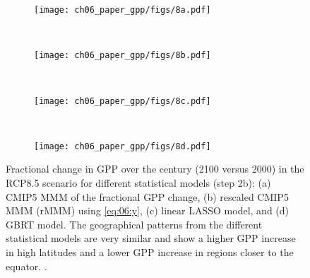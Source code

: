 \begin{figure}[t]
  \centering
  \begin{subfigure}[b]{\SubfigureWidth{}}
    \texttt{[image: ch06\_paper\_gpp/figs/8a.pdf]}
    \caption{}
    \label{fig:06:step2b_results:a}
  \end{subfigure}
  ~
  \begin{subfigure}[b]{\SubfigureWidth{}}
    \texttt{[image: ch06\_paper\_gpp/figs/8b.pdf]}
    \caption{}
    \label{fig:06:step2b_results:b}
  \end{subfigure}
  \\
  \begin{subfigure}[b]{\SubfigureWidth{}}
    \texttt{[image: ch06\_paper\_gpp/figs/8c.pdf]}
    \caption{}
    \label{fig:06:step2b_results:c}
  \end{subfigure}
  ~
  \begin{subfigure}[b]{\SubfigureWidth{}}
    \texttt{[image: ch06\_paper\_gpp/figs/8d.pdf]}
    \caption{}
    \label{fig:06:step2b_results:d}
  \end{subfigure}
  \caption[
    Illustration of our \acl{ML} approach to constrain the fractional change in
    \acf{GPP} over the  century with observations in step 2b.
  ]{
    Fractional change in \acf{GPP} over the  century (2100 versus 2000)
    in the \acs{RCP}8.5 scenario for different statistical models (step 2b):
    (a) \acs{CMIP}5 \acf{MMM} of the fractional \acs{GPP} change, (b) rescaled
    \acs{CMIP}5 \acl{MMM} (r\acs{MMM}) using \cref{eq:06:y}, (c) linear
    \acf{LASSO} model, and (d) \acf{GBRT} model. The geographical patterns from
    the different statistical models are very similar and show a higher
    \acs{GPP} increase in high latitudes and a lower \acs{GPP} increase in
    regions closer to the equator. .
  }
  \label{fig:06:step2b_results}
\end{figure}

